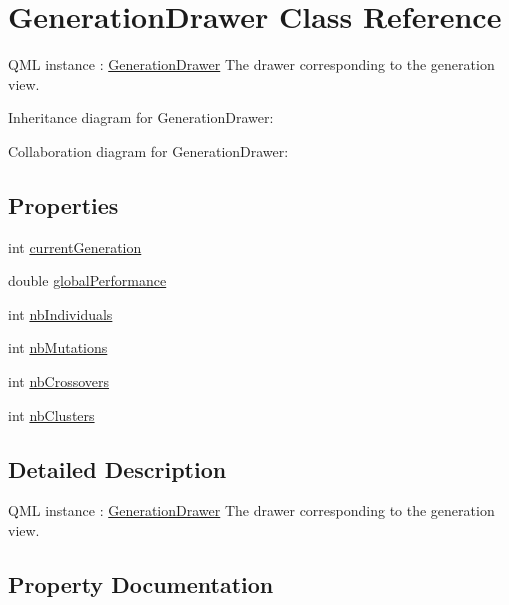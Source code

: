 \hypertarget{class_generation_drawer}{}\section{Generation\+Drawer Class Reference}
\label{class_generation_drawer}


Q\+ML instance \+: \hyperlink{class_generation_drawer}{Generation\+Drawer} The drawer corresponding to the generation view.  




Inheritance diagram for Generation\+Drawer\+:


Collaboration diagram for Generation\+Drawer\+:
\subsection*{Properties}
\begin{DoxyCompactItemize}
\item 
int \hyperlink{class_generation_drawer_addfc36a0e697d85c8a2a378d31ab0d8a}{current\+Generation}
\item 
double \hyperlink{class_generation_drawer_a29c6e840b9baf5ab6d81d2d0e7ebad96}{global\+Performance}
\item 
int \hyperlink{class_generation_drawer_a16a03661e49be8af2816b60dd06d70be}{nb\+Individuals}
\item 
int \hyperlink{class_generation_drawer_a34ebc0a04244dd38adfc754d84cb2155}{nb\+Mutations}
\item 
int \hyperlink{class_generation_drawer_ab952aef839481b9e5c7403cd30a7b02a}{nb\+Crossovers}
\item 
int \hyperlink{class_generation_drawer_a93d3ef7769f775cdc79233e051a002cb}{nb\+Clusters}
\end{DoxyCompactItemize}


\subsection{Detailed Description}
Q\+ML instance \+: \hyperlink{class_generation_drawer}{Generation\+Drawer} The drawer corresponding to the generation view. 

\subsection{Property Documentation}
\mbox{\label{class_generation_drawer_addfc36a0e697d85c8a2a378d31ab0d8a}} 
